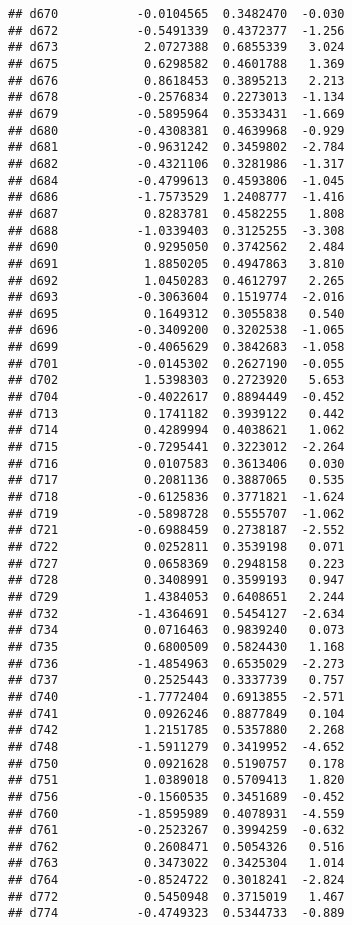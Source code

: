 \documentclass[
]{article}
\begin{document}
\begin{verbatim}
## d670           -0.0104565  0.3482470  -0.030
## d672           -0.5491339  0.4372377  -1.256
## d673            2.0727388  0.6855339   3.024
## d675            0.6298582  0.4601788   1.369
## d676            0.8618453  0.3895213   2.213
## d678           -0.2576834  0.2273013  -1.134
## d679           -0.5895964  0.3533431  -1.669
## d680           -0.4308381  0.4639968  -0.929
## d681           -0.9631242  0.3459802  -2.784
## d682           -0.4321106  0.3281986  -1.317
## d684           -0.4799613  0.4593806  -1.045
## d686           -1.7573529  1.2408777  -1.416
## d687            0.8283781  0.4582255   1.808
## d688           -1.0339403  0.3125255  -3.308
## d690            0.9295050  0.3742562   2.484
## d691            1.8850205  0.4947863   3.810
## d692            1.0450283  0.4612797   2.265
## d693           -0.3063604  0.1519774  -2.016
## d695            0.1649312  0.3055838   0.540
## d696           -0.3409200  0.3202538  -1.065
## d699           -0.4065629  0.3842683  -1.058
## d701           -0.0145302  0.2627190  -0.055
## d702            1.5398303  0.2723920   5.653
## d704           -0.4022617  0.8894449  -0.452
## d713            0.1741182  0.3939122   0.442
## d714            0.4289994  0.4038621   1.062
## d715           -0.7295441  0.3223012  -2.264
## d716            0.0107583  0.3613406   0.030
## d717            0.2081136  0.3887065   0.535
## d718           -0.6125836  0.3771821  -1.624
## d719           -0.5898728  0.5555707  -1.062
## d721           -0.6988459  0.2738187  -2.552
## d722            0.0252811  0.3539198   0.071
## d727            0.0658369  0.2948158   0.223
## d728            0.3408991  0.3599193   0.947
## d729            1.4384053  0.6408651   2.244
## d732           -1.4364691  0.5454127  -2.634
## d734            0.0716463  0.9839240   0.073
## d735            0.6800509  0.5824430   1.168
## d736           -1.4854963  0.6535029  -2.273
## d737            0.2525443  0.3337739   0.757
## d740           -1.7772404  0.6913855  -2.571
## d741            0.0926246  0.8877849   0.104
## d742            1.2151785  0.5357880   2.268
## d748           -1.5911279  0.3419952  -4.652
## d750            0.0921628  0.5190757   0.178
## d751            1.0389018  0.5709413   1.820
## d756           -0.1560535  0.3451689  -0.452
## d760           -1.8595989  0.4078931  -4.559
## d761           -0.2523267  0.3994259  -0.632
## d762            0.2608471  0.5054326   0.516
## d763            0.3473022  0.3425304   1.014
## d764           -0.8524722  0.3018241  -2.824
## d772            0.5450948  0.3715019   1.467
## d774           -0.4749323  0.5344733  -0.889

\end{verbatim}
\end{document}
